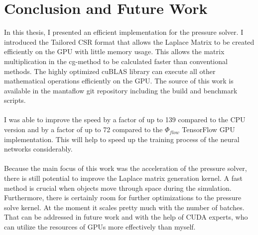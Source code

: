 \chapter{Conclusion and Future Work}\label{chapter:conclusion}

In this thesis, I presented an efficient implementation for the pressure solver. I introduced the Tailored CSR format that allows the Laplace Matrix to be created efficiently on the GPU with little memory usage. This allows the matrix multiplication in the cg-method to be calculated faster than conventional methods. The highly optimized cuBLAS library can execute all other mathematical operations efficiently on the GPU. The source of this work is available in the mantaflow git repository including the build and benchmark scripts.\\\\
I was able to improve the speed by a factor of up to 139 compared to the CPU version and by a factor of up to 72 compared to the $\Phi_{flow}$ TensorFlow GPU implementation. This will help to speed up the training process of the neural networks considerably. \\\\
Because the main focus of this work was the acceleration of the pressure solver, there is still potential to improve the Laplace matrix generation kernel. A fast method is crucial when objects move through space during the simulation. Furthermore, there is certainly room for further optimizations to the pressure solve kernel. At the moment it scales pretty much with the number of batches. That can be addressed in future work and with the help of CUDA experts, who can utilize the resources of GPUs more effectively than myself. 